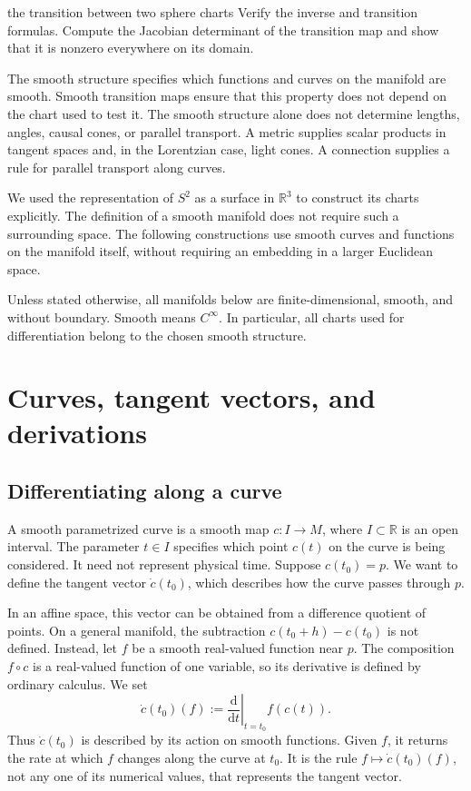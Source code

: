 \documentclass[11pt,a4paper]{article}
\numberwithin{equation}{section}
\newcommand{\R}{\mathbb R}
\newcommand{\dd}{\mathrm d}
\newcommand{\slideref}[1]{\par\nobreak\smallskip\nobreak{\footnotesize\color{ink!60}\textsc{Source slide #1}}\par\nobreak\smallskip\nobreak}
\begin{document}
\begin{studentwork}[3.6cm]{the transition between two sphere charts}
Verify the inverse and transition formulas. Compute the Jacobian
determinant of the transition map and show that it is nonzero
everywhere on its domain.
\end{studentwork}

\slideref{7}
The smooth structure specifies which functions and curves on the
manifold are smooth. Smooth transition maps ensure that this property
does not depend on the chart used to test it. The smooth structure
alone does not determine lengths, angles, causal cones, or parallel
transport. A metric supplies scalar products in tangent spaces and,
in the Lorentzian case, light cones. A connection supplies a rule for
parallel transport along curves.

We used the representation of \(S^2\) as a surface in \(\R^3\) to
construct its charts explicitly. The definition of a smooth manifold
does not require such a surrounding space. The following constructions
use smooth curves and functions on the manifold itself, without
requiring an embedding in a larger Euclidean space.


Unless stated otherwise, all manifolds below are finite-dimensional,
smooth, and without boundary. Smooth means \(C^\infty\). In particular,
all charts used for differentiation belong to the chosen smooth structure.

\section{Curves, tangent vectors, and derivations}
\label{sec:tangent}
\slideref{8}

\subsection{Differentiating along a curve}

A smooth parametrized curve is a smooth map \(c:I\to M\), where
\(I\subset\R\) is an open interval. The parameter \(t\in I\) specifies
which point \(c(t)\) on the curve is being considered. It need not represent
physical time. Suppose \(c(t_0)=p\). We want to define the tangent vector
\(\dot c(t_0)\), which describes how the curve passes through \(p\).

In an affine space, this vector can be obtained from a difference quotient
of points. On a general manifold, the subtraction
\(c(t_0+h)-c(t_0)\) is not defined. Instead, let \(f\) be a smooth real-valued
function near \(p\). The composition \(f\circ c\) is a real-valued function
of one variable, so its derivative is defined by ordinary calculus. We set
\begin{equation}
 \dot c(t_0)(f)
 :=\left.\frac{\dd}{\dd t}\right|_{t=t_0} f(c(t)).
 \label{eq:curve-action}
\end{equation}
Thus \(\dot c(t_0)\) is described by its action on smooth functions. Given
\(f\), it returns the rate at which \(f\) changes along the curve at
\(t_0\). It is the rule \(f\mapsto\dot c(t_0)(f)\), not any one of its
numerical values, that represents the tangent vector.
\end{document}
